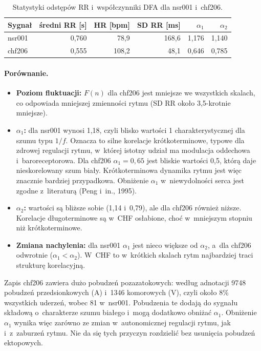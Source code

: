 \documentclass[11pt,a4paper]{article}
\begin{document}
\begin{table}[ht]
  \centering
  \caption{Statystyki odstępów RR i~współczynniki DFA dla nsr001 i~chf206.}
  \label{tab:alpha}
  \begin{tabular}{lrrrrr}
    \toprule
    Sygnał & średni RR [s] & HR [bpm] & SD RR [ms] & $\alpha_1$ & $\alpha_2$ \\
    \midrule
    nsr001 & 0,760 & 78,9 & 168,6 & 1,176 & 1,140 \\
    chf206 & 0,555 & 108,2 & 48,1 & 0,646 & 0,785 \\
    \bottomrule
  \end{tabular}
\end{table}

\paragraph{Porównanie.}
\begin{itemize}
  \item \textbf{Poziom fluktuacji:} $F(n)$ dla chf206 jest mniejsze we wszystkich skalach, co odpowiada mniejszej zmienności rytmu (SD RR około 3,5-krotnie mniejsze).
  \item \textbf{$\alpha_1$:} dla nsr001 wynosi 1,18, czyli blisko wartości 1 charakterystycznej dla szumu typu $1/f$. Oznacza to silne korelacje krótkoterminowe, typowe dla zdrowej regulacji rytmu, w~której istotny udział ma modulacja oddechowa i~baroreceptorowa. Dla chf206 $\alpha_1 = 0{,}65$ jest bliskie wartości 0,5, którą daje nieskorelowany szum biały. Krótkoterminowa dynamika rytmu jest więc znacznie bardziej przypadkowa. Obniżenie $\alpha_1$ w~niewydolności serca jest zgodne z~literaturą (Peng i~in., 1995).
  \item \textbf{$\alpha_2$:} wartości są bliższe sobie (1,14 i~0,79), ale dla chf206 również niższe. Korelacje długoterminowe są w~CHF osłabione, choć w~mniejszym stopniu niż krótkoterminowe.
  \item \textbf{Zmiana nachylenia:} dla nsr001 $\alpha_1$ jest nieco większe od $\alpha_2$, a~dla chf206 odwrotnie ($\alpha_1 < \alpha_2$). W~CHF to w~krótkich skalach rytm najbardziej traci strukturę korelacyjną.
\end{itemize}

Zapis chf206 zawiera dużo pobudzeń pozazatokowych: według adnotacji 9748 pobudzeń przedsionkowych (A) i~1346 komorowych (V), czyli około 8\% wszystkich uderzeń, wobec 81 w~nsr001. Pobudzenia te dodają do sygnału składową o~charakterze szumu białego i~mogą dodatkowo obniżać $\alpha_1$. Obniżenie $\alpha_1$ wynika więc zarówno ze zmian w~autonomicznej regulacji rytmu, jak i~z~zaburzeń rytmu. Nie da się tych przyczyn rozdzielić bez usunięcia pobudzeń ektopowych.
\end{document}
